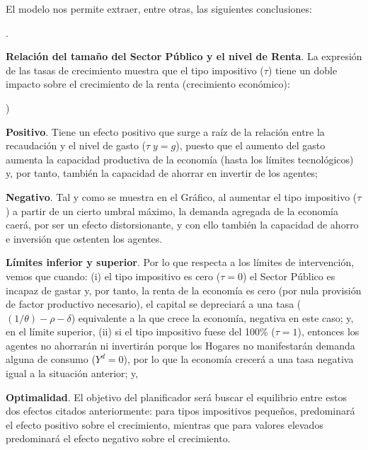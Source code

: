 \documentclass[10pt,a4paper]{article}
\newcounter{alphaitem}
\newcounter{numitem}
\newenvironment{la}
      {\begin{list}{\alph{alphaitem})}{%
          \usecounter{alphaitem}%
          \setlength{\leftmargin}{1cm}%
          \setlength{\parskip}{3pt}%
          \setlength{\itemsep}{0pt}%
          \setlength{\parsep}{0pt}%
      }}
      {\end{list}}
\newenvironment{lnum}
      {\begin{list}{\arabic{numitem}.}{%
          \usecounter{numitem}%
          \setlength{\leftmargin}{1cm}%
          \setlength{\parskip}{3pt}%
          \setlength{\itemsep}{0pt}%
          \setlength{\parsep}{0pt}%
      }}
      {\end{list}}
\begin{document}
El modelo nos permite extraer, entre otras, las siguientes conclusiones:
\begin{lnum}
    \item \textbf{Relación del tamaño del Sector Público y el nivel de Renta}. La expresión de las tasas de crecimiento muestra que el tipo impositivo ($\tau$) tiene un doble impacto sobre el crecimiento de la renta (crecimiento económico):
    \begin{la}
        \item \textbf{Positivo}. Tiene un efecto positivo que surge a raíz de la relación entre la recaudación y el nivel de gasto ($\tau\;y=g$), puesto que el aumento del gasto aumenta la capacidad productiva de la economía (hasta los límites tecnológicos) y, por tanto, también la capacidad de ahorrar en invertir de los agentes;
        \item \textbf{Negativo}. Tal y como se muestra en el Gráfico, al aumentar el tipo impositivo ($\tau$) a partir de un cierto umbral máximo, la demanda agregada de la economía caerá, por ser un efecto distorsionante, y con ello también la capacidad de ahorro e inversión que ostenten los agentes. 
    \end{la}
    \item \textbf{Límites inferior y superior}. Por lo que respecta a los límites de intervención, vemos que cuando: (i) el tipo impositivo es cero ($\tau=0$) el Sector Público es incapaz de gastar y, por tanto, la renta de la economía es cero (por nula provisión de factor productivo necesario), el capital se depreciará a una tasa ($(1/\theta)-\rho-\delta$) equivalente a la que crece la economía, negativa en este caso; y, en el límite superior, (ii) si el tipo impositivo fuese del 100\% ($\tau=1$), entonces los agentes no ahorrarán ni invertirán porque los Hogares no manifestarán demanda alguna de consumo ($Y^d=0$), por lo que la economía crecerá a una tasa negativa igual a la situación anterior; y,
    \item \textbf{Optimalidad}. El objetivo del planificador será buscar el equilibrio entre estos dos efectos citados anteriormente: para tipos impositivos pequeños, predominará el efecto positivo sobre el crecimiento, mientras que para valores elevados predominará el efecto negativo sobre el crecimiento.
\end{lnum}
\end{document}
